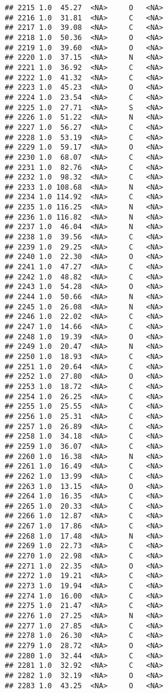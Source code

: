 \documentclass[
]{article}
\begin{document}
\begin{verbatim}
## 2215 1.0  45.27  <NA>     O   <NA>
## 2216 1.0  31.81  <NA>     C   <NA>
## 2217 1.0  39.08  <NA>     C   <NA>
## 2218 1.0  50.36  <NA>     O   <NA>
## 2219 1.0  39.60  <NA>     O   <NA>
## 2220 1.0  37.15  <NA>     N   <NA>
## 2221 1.0  36.92  <NA>     C   <NA>
## 2222 1.0  41.32  <NA>     C   <NA>
## 2223 1.0  45.23  <NA>     O   <NA>
## 2224 1.0  23.54  <NA>     C   <NA>
## 2225 1.0  27.71  <NA>     S   <NA>
## 2226 1.0  51.22  <NA>     N   <NA>
## 2227 1.0  56.27  <NA>     C   <NA>
## 2228 1.0  53.19  <NA>     C   <NA>
## 2229 1.0  59.17  <NA>     O   <NA>
## 2230 1.0  68.07  <NA>     C   <NA>
## 2231 1.0  82.76  <NA>     C   <NA>
## 2232 1.0  98.32  <NA>     C   <NA>
## 2233 1.0 108.68  <NA>     N   <NA>
## 2234 1.0 114.92  <NA>     C   <NA>
## 2235 1.0 116.25  <NA>     N   <NA>
## 2236 1.0 116.82  <NA>     N   <NA>
## 2237 1.0  46.04  <NA>     N   <NA>
## 2238 1.0  39.56  <NA>     C   <NA>
## 2239 1.0  29.25  <NA>     C   <NA>
## 2240 1.0  22.30  <NA>     O   <NA>
## 2241 1.0  47.27  <NA>     C   <NA>
## 2242 1.0  48.82  <NA>     C   <NA>
## 2243 1.0  54.28  <NA>     O   <NA>
## 2244 1.0  50.66  <NA>     N   <NA>
## 2245 1.0  26.08  <NA>     N   <NA>
## 2246 1.0  22.02  <NA>     C   <NA>
## 2247 1.0  14.66  <NA>     C   <NA>
## 2248 1.0  19.39  <NA>     O   <NA>
## 2249 1.0  20.47  <NA>     N   <NA>
## 2250 1.0  18.93  <NA>     C   <NA>
## 2251 1.0  20.64  <NA>     C   <NA>
## 2252 1.0  27.80  <NA>     O   <NA>
## 2253 1.0  18.72  <NA>     C   <NA>
## 2254 1.0  26.25  <NA>     C   <NA>
## 2255 1.0  25.55  <NA>     C   <NA>
## 2256 1.0  25.31  <NA>     C   <NA>
## 2257 1.0  26.89  <NA>     C   <NA>
## 2258 1.0  34.18  <NA>     C   <NA>
## 2259 1.0  36.07  <NA>     C   <NA>
## 2260 1.0  16.38  <NA>     N   <NA>
## 2261 1.0  16.49  <NA>     C   <NA>
## 2262 1.0  13.99  <NA>     C   <NA>
## 2263 1.0  13.15  <NA>     O   <NA>
## 2264 1.0  16.35  <NA>     C   <NA>
## 2265 1.0  20.33  <NA>     C   <NA>
## 2266 1.0  12.87  <NA>     C   <NA>
## 2267 1.0  17.86  <NA>     C   <NA>
## 2268 1.0  17.48  <NA>     N   <NA>
## 2269 1.0  22.73  <NA>     C   <NA>
## 2270 1.0  22.98  <NA>     C   <NA>
## 2271 1.0  22.35  <NA>     O   <NA>
## 2272 1.0  19.21  <NA>     C   <NA>
## 2273 1.0  19.94  <NA>     C   <NA>
## 2274 1.0  16.00  <NA>     C   <NA>
## 2275 1.0  21.47  <NA>     C   <NA>
## 2276 1.0  27.25  <NA>     N   <NA>
## 2277 1.0  27.85  <NA>     C   <NA>
## 2278 1.0  26.30  <NA>     C   <NA>
## 2279 1.0  28.72  <NA>     O   <NA>
## 2280 1.0  32.44  <NA>     C   <NA>
## 2281 1.0  32.92  <NA>     C   <NA>
## 2282 1.0  32.19  <NA>     O   <NA>
## 2283 1.0  43.25  <NA>     O   <NA>

\end{verbatim}
\end{document}
